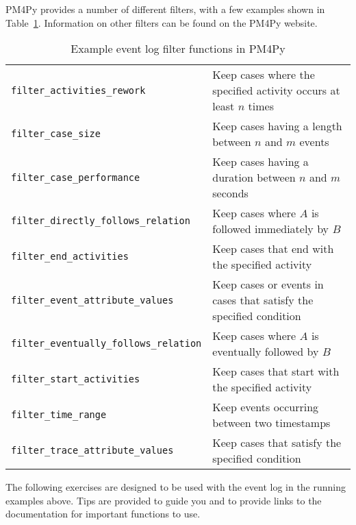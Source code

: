 PM4Py provides a number of different filters, with a few examples shown in Table~\ref{tab:pm4py_filters}. Information on other filters can be found on the PM4Py website.

\begin{table}
\small
\renewcommand{\arraystretch}{1.1}
\begin{tabularx}{\textwidth}{l|X} \hline 
\texttt{filter\_activities\_rework} & Keep cases where the specified activity occurs at least $n$ times \\
\texttt{filter\_case\_size} & Keep cases having a length between $n$ and $m$ events \\
\texttt{filter\_case\_performance} & Keep cases having a duration between $n$ and $m$ seconds \\
\texttt{filter\_directly\_follows\_relation} & Keep cases where $A$ is followed immediately by $B$ \\
\texttt{filter\_end\_activities} & Keep cases that end with the specified activity \\
\texttt{filter\_event\_attribute\_values} & Keep cases or events in cases that satisfy the specified condition \\ 
\texttt{filter\_eventually\_follows\_relation} & Keep cases where $A$ is eventually followed by $B$ \\
\texttt{filter\_start\_activities} & Keep cases that start with the specified activity \\
\texttt{filter\_time\_range} & Keep events occurring between two timestamps \\
\texttt{filter\_trace\_attribute\_values} & Keep cases that satisfy the specified condition \\ \hline
\end{tabularx}
\caption{Example event log filter functions in PM4Py}
\label{tab:pm4py_filters}
\end{table}


The following exercises are designed to be used with the event log in the running examples above. Tips are provided to guide you and to provide links to the documentation for important functions to use.

